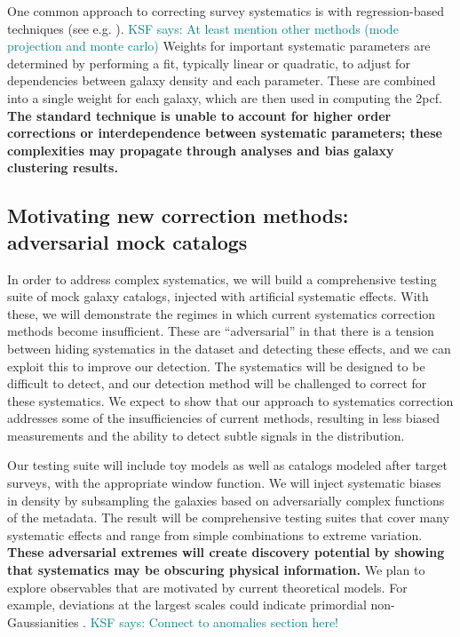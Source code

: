 \documentclass[12pt, fullpage, letterpaper]{article}
\newcommand{\KSF}[1]{\textcolor{teal}{KSF says: #1}}
\newcommand{\cf}{2pcf\xspace}
\begin{document}
One common approach to correcting survey systematics is with regression-based techniques (see e.g. \citealt{Ross2010}). \KSF{At least mention other methods (mode projection and monte carlo)}
Weights for important systematic parameters are determined by performing a fit, typically linear or quadratic, to adjust for dependencies between galaxy density and each parameter.
These are combined into a single weight for each galaxy, which are then used in computing the \cf.
\textbf{The standard technique is unable to account for higher order corrections or interdependence between systematic parameters; these complexities may propagate through analyses and bias galaxy clustering results.}

\subsection{Motivating new correction methods: adversarial mock catalogs}

In order to address complex systematics, we will build a comprehensive testing suite of mock galaxy catalogs, injected with artificial systematic effects.
With these, we will demonstrate the regimes in which current systematics correction methods become insufficient.
These are ``adversarial'' in that there is a tension between hiding systematics in the dataset and detecting these effects, and we can exploit this to improve our detection.
The systematics will be designed to be difficult to detect, and our detection method will be challenged to correct for these systematics. 
We expect to show that our approach to systematics correction addresses some of the insufficiencies of current methods, resulting in less biased measurements and the ability to detect subtle signals in the distribution.

Our testing suite will include toy models as well as catalogs modeled after target surveys, with the appropriate window function.
We will inject systematic biases in density by subsampling the galaxies based on adversarially complex functions of the metadata.
The result will be comprehensive testing suites that cover many systematic effects and range from simple combinations to extreme variation.
\textbf{These adversarial extremes will create discovery potential by showing that systematics may be obscuring physical information.}
We plan to explore observables that are motivated by current theoretical models.
For example, deviations at the largest scales could indicate primordial non-Gaussianities \citep{Dalal2008}. \KSF{Connect to anomalies section here!}
\end{document}
